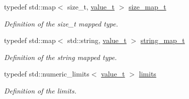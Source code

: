 \begin{DoxyCompactItemize}
typedef std::map$<$ size\_\-t, \hyperlink{class_t}{value\_\-t} $>$ \hyperlink{struct_d_d4hep_1_1_primitive_af954a6789fd528d13e6533a4bdb3aa21}{size\_\-map\_\-t}
\begin{DoxyCompactList}\small\item\em Definition of the size\_\-t mapped type. \item\end{DoxyCompactList}\item 
typedef std::map$<$ std::string, \hyperlink{class_t}{value\_\-t} $>$ \hyperlink{struct_d_d4hep_1_1_primitive_a27b9d11befb4af57c39af66b69efdbb4}{string\_\-map\_\-t}
\begin{DoxyCompactList}\small\item\em Definition of the string mapped type. \item\end{DoxyCompactList}\item 
typedef std::numeric\_\-limits$<$ \hyperlink{class_t}{value\_\-t} $>$ \hyperlink{struct_d_d4hep_1_1_primitive_a9f6d14410388a5c8067d274030dbdc3c}{limits}
\begin{DoxyCompactList}\small\item\em Definition of the limits. \item\end{DoxyCompactList}\end{DoxyCompactItemize}
